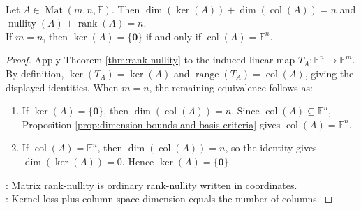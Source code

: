 \begin{corollary} \label{cor:matrix-rank-nullity} \\
Let $A\in\operatorname{Mat}(m,n,\mathbb{F})$. Then $\dim(\ker(A))+\dim(\operatorname{col}(A))=n$ and $\operatorname{nullity}(A)+\operatorname{rank}(A)=n$.\\
If $m=n$, then $\ker(A)=\{\mathbf{0}\}$ if and only if $\operatorname{col}(A)=\mathbb{F}^n$.
\begin{proof}
Apply Theorem \ref{thm:rank-nullity} to the induced linear map $T_A:\mathbb{F}^n\to\mathbb{F}^m$. By definition, $\ker(T_A)=\ker(A)$ and $\operatorname{range}(T_A)=\operatorname{col}(A)$, giving the displayed identities. When $m=n$, the remaining equivalence follows as:
\begin{enumerate}[label=\roman*.]
\setlength{\itemsep}{0pt}
\item[$(\Rightarrow)$] If $\ker(A)=\{\mathbf{0}\}$, then $\dim(\operatorname{col}(A))=n$. Since $\operatorname{col}(A)\subseteq\mathbb{F}^n$, Proposition \ref{prop:dimension-bounds-and-basis-criteria} gives $\operatorname{col}(A)=\mathbb{F}^n$.
\item[$(\Leftarrow)$] If $\operatorname{col}(A)=\mathbb{F}^n$, then $\dim(\operatorname{col}(A))=n$, so the identity gives $\dim(\ker(A))=0$. Hence $\ker(A)=\{\mathbf{0}\}$.
\end{enumerate}
: Matrix rank-nullity is ordinary rank-nullity written in coordinates.\\
: Kernel loss plus column-space dimension equals the number of columns.
\end{proof}
\end{corollary}

